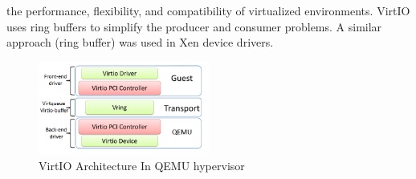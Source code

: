 \documentclass[a4paper, 11pt, twocolumn]{article}
\theoremstyle{nonumberplain}
\begin{document}
the performance, flexibility, and compatibility of virtualized environments.
VirtIO uses ring buffers to simplify the producer and consumer problems.
A similar approach (ring buffer) was used in Xen device drivers.
\begin{figure}[H]
    \center
    \includegraphics[width=0.5\textwidth]{virtio.png}
    \caption{VirtIO Architecture In QEMU hypervisor}
    \label{virtio}
\end{figure}
\end{document}
